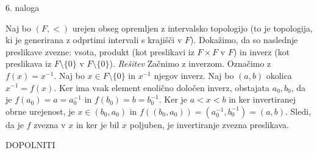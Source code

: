 \documentclass[a4paper, 12pt]{article}
\begin{document}
\begin{flushleft}
6. naloga
\end{flushleft}
Naj bo $(F,<)$ urejen obseg opremljen z intervalsko topologijo (to je topologija, ki je generirana z odprtimi intervali s krajišči v $F$). Dokažimo, da so naslednje preslikave zvezne: vsota, produkt (kot preslikavi iz $F\times F$ v $F$) in inverz (kot preslikava iz $F \setminus \{0\}$ v $F\setminus \{0\}$).
\newline
\emph{Rešitev}
\newline
Začnimo z inverzom. Označimo z $f(x) = x^{-1}$. Naj bo $x\in F\setminus\{0\}$ in $x^{-1}$ njegov inverz. Naj bo $(a,b)$ okolica $x^{-1} = f(x)$. Ker ima vsak element enolično določen inverz, obstajata $a_0, b_0$, da je $f(a_0) = a = a_0^{-1}$ in $f(b_0) = b = b_0^{-1}$. Ker je $a< x <b$ in ker invertiranej obrne urejenost, je $x\in (b_0,a_0)$ in $f((b_0,a_0)) = (a_0^{-1}, b_0^{-1}) = (a,b)$. Sledi, da je $f$ zvezna v $x$ in ker je bil $x$ poljuben, je invertiranje zvezna preslikava.

DOPOLNITI
\end{document}
